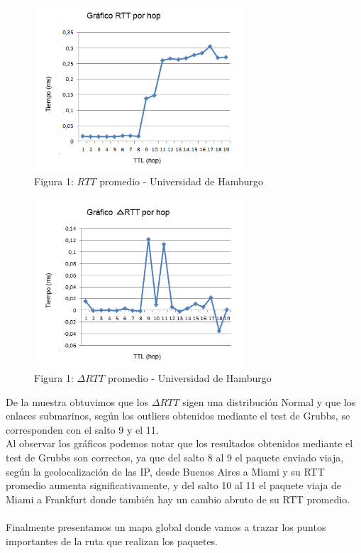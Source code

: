 \begin{figure}[h]
	\begin{center}
    \includegraphics[width=0.7\textwidth]{img_analisis3/grafico-rtt-promedio.jpg} 
    \caption{Figura 1: $RTT$ promedio - Universidad de Hamburgo}	
	\end{center} 
\end{figure}
\newpage


\begin{figure}[h]
	\begin{center}
    \includegraphics[width=0.7\textwidth]{img_analisis3/grafico-delta-rtt-promedio.jpg} 
    \caption{Figura 1: $\Delta RTT$ promedio - Universidad de Hamburgo}	
	\end{center} 
\end{figure}

De la muestra obtuvimos que los $\Delta RTT$ sigen una distribuci\'on Normal y que los enlaces submarinos, según los outliers obtenidos mediante el test de Grubbs, se corresponden con el salto 9 y el 11.
\\
Al observar los gráficos podemos notar que los resultados obtenidos mediante el test de Grubbs son correctos, ya que del salto 8 al 9 el paquete enviado viaja, según la geolocalización de las IP, desde Buenos Aires a Miami y su RTT promedio aumenta significativamente, y del salto 10 al 11 el paquete viaja de Miami a Frankfurt donde también hay un cambio abruto de su RTT promedio.
\\
\\
Finalmente presentamos un mapa global donde vamos a trazar los puntos importantes de la ruta que realizan los paquetes. 

